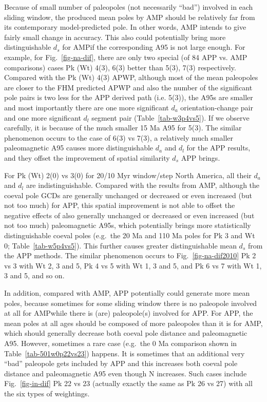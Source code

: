 Because of small number of paleopoles (not necessarily ``bad'') involved in
each sliding window, the produced mean poles by AMP should be relatively far
from its contemporary model-predicted pole. In other words, AMP intends to give
fairly small change in accuracy. This also could potentially bring more
distinguishable $d_s$ for AMP\@ if the corresponding A95 is not large enough.
For example, for Fig.~\ref{fig-na-dif}, there are only two special (of 84 APP
vs. AMP comparisons) cases Pk (Wt) 4(3), 6(3) better than 5(3), 7(3)
respectively. Compared with the Pk (Wt) 4(3) APWP, although most of the mean
paleopoles are closer to the FHM predicted APWP and also the number of the
significant pole pairs is two less for the APP derived path (i.e. 5(3)), the A95s
are smaller and most importantly there are one more significant $d_a$
orientation-change pair and one more significant $d_l$ segment pair
(Table~\ref{tab-w3p4vs5}). If we observe carefully, it is because of the much
smaller 15 Ma A95 for 5(3). The similar phenomenon occurs to the case of 6(3) vs
7(3), a relatively much smaller paleomagnetic A95 causes more distinguishable
$d_a$ and $d_l$ for the APP results, and they offset the improvement of spatial
similarity $d_s$ APP brings.

For Pk (Wt) 2(0) vs 3(0) for 20/10 Myr window/step North America, all their $d_a$ and
$d_l$ are indistinguishable. Compared with the results from AMP, although the
coeval pole GCDs are generally unchanged or decreased or even increased (but not
too much) for APP, this spatial improvement is not able to offset the negative
effects of also generally unchanged or decreased or even increased (but not too
much) paleomagnetic A95s, which potentially brings more statistically
distinguishable coeval poles (e.g.\ the 20 Ma and 110 Ma poles for Pk 3 and
Wt 0; Table~\ref{tab-w5p4vs5}). This further causes greater
distinguishable mean $d_s$ from the APP methods. The similar phenomenon occurs
to Fig.~\ref{fig-na-dif2010} Pk 2 vs 3 with Wt 2, 3 and 5, Pk
4 vs 5 with Wt 1, 3 and 5, and Pk 6 vs 7 with Wt 1, 3 and 5, and
so on.

In addition, compared with AMP, APP potentially could generate more mean poles,
because sometimes for some sliding window there is no paleopole involved at all
for AMP\@ while there is (are) paleopole(s) involved for APP\@. For APP, the
mean poles at all ages should be composed of more paleopoles than it is for
AMP, which should generally decrease both coeval pole distance and paleomagnetic
A95. However, sometimes a rare case (e.g.\ the 0 Ma comparison shown in
Table~\ref{tab-501w0p22vs23}) happens. It is sometimes that an additional
very ``bad'' paleopole gets included by APP and this increases both coeval pole
distance and paleomagnetic A95 even though N increases. Such cases include
Fig.~\ref{fig-in-dif} Pk 22 vs 23 (actually exactly the same as Pk 26
vs 27) with all the six types of weightings.

